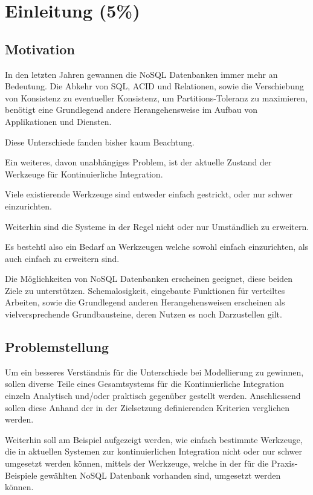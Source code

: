 \chapter{Einleitung (5\%) }

\section{Motivation}

In den letzten Jahren gewannen die NoSQL Datenbanken immer mehr an Bedeutung.
Die Abkehr von SQL, ACID und Relationen, sowie die Verschiebung von Konsistenz zu eventueller Konsistenz, um Partitions-Toleranz zu maximieren,
benötigt eine Grundlegend andere Herangehensweise im Aufbau von Applikationen und Diensten.

Diese Unterschiede fanden bisher kaum Beachtung.

Ein weiteres, davon unabhängiges Problem,
ist der aktuelle Zustand der Werkzeuge für Kontinuierliche Integration.

Viele existierende Werkzeuge sind entweder einfach gestrickt,
oder nur schwer einzurichten.

Weiterhin sind die Systeme in der Regel nicht oder nur Umständlich zu erweitern.

Es bestehtl also ein Bedarf an Werkzeugen welche sowohl einfach einzurichten,
als auch einfach zu erweitern sind.

Die Möglichkeiten von NoSQL Datenbanken erscheinen geeignet, diese beiden Ziele zu unterstützen.
Schemalosigkeit, eingebaute Funktionen für verteiltes Arbeiten,
sowie die Grundlegend anderen Herangehensweisen erscheinen
als vielversprechende Grundbausteine, deren Nutzen es noch Darzustellen gilt.




\section{Problemstellung}

Um ein besseres Verständnis für die Unterschiede bei Modellierung zu gewinnen,
sollen diverse Teile eines Gesamtsystems für die Kontinuierliche Integration einzeln Analytisch und/oder praktisch gegenüber gestellt werden.
Anschliessend sollen diese Anhand der in der Zielsetzung definierenden Kriterien verglichen werden.

Weiterhin soll am Beispiel aufgezeigt werden, wie einfach bestimmte Werkzeuge,
die in aktuellen Systemen zur kontinuierlichen Integration nicht oder nur schwer umgesetzt werden können,
mittels der Werkzeuge, welche in der für die Praxis-Beispiele gewählten NoSQL Datenbank vorhanden sind,
umgesetzt werden können.

